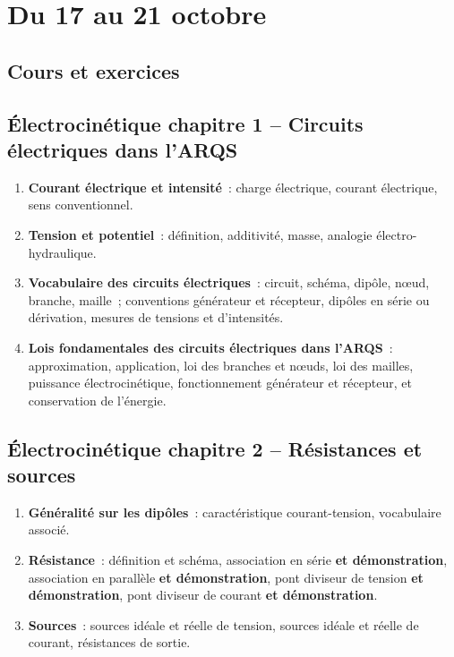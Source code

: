 \documentclass[a4paper, 12pt, final, garamond]{book}
\begin{document}
\setcounter{chapter}{5}

\chapter{Du 17 au 21 octobre}

\section{Cours et exercices}

\section*{Électrocinétique chapitre 1 -- Circuits électriques dans l'ARQS}
\begin{enumerate}[label=\Roman*]
    \item \textbf{Courant électrique et intensité}~: charge électrique, courant
        électrique, sens conventionnel.
    \item \textbf{Tension et potentiel}~: définition, additivité, masse,
        analogie électro-hydraulique.
    \item \textbf{Vocabulaire des circuits électriques}~: circuit, schéma,
        dipôle, nœud, branche, maille~; conventions générateur et récepteur,
        dipôles en série ou dérivation, mesures de tensions et d'intensités.
    \item \textbf{Lois fondamentales des circuits électriques dans l'ARQS}~:
        approximation, application, loi des branches et nœuds, loi des mailles,
        puissance électrocinétique, fonctionnement générateur et récepteur, et
        conservation de l'énergie.
\end{enumerate}

\section*{Électrocinétique chapitre 2 -- Résistances et sources}
\begin{enumerate}[label=\Roman*]
    \item \textbf{Généralité sur les dipôles}~: caractéristique courant-tension,
        vocabulaire associé.
    \item \textbf{Résistance}~: définition et schéma, association en série
        \textbf{et démonstration}, association en parallèle \textbf{et
        démonstration}, pont diviseur de tension \textbf{et démonstration}, pont
        diviseur de courant \textbf{et démonstration}.
    \item \textbf{Sources}~: sources idéale et réelle de tension, sources idéale
        et réelle de courant, résistances de sortie.
\end{enumerate}
\end{document}

